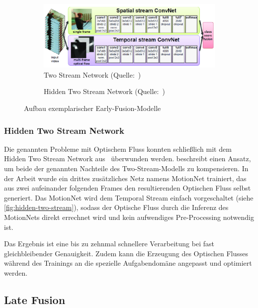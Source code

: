 \begin{figure}
    \centering
    \begin{subfigure}[b]{.5\textwidth}
        \centering
        \includegraphics[width=.95\linewidth]{img/03_Simonyan14}
        \caption{Two Stream Network (Quelle:~\cite{Simonyan14})}
        \label{fig:two-stream}
    \end{subfigure}%
    \hfill
    \begin{subfigure}[b]{.5\textwidth}
        \centering
        \caption{Hidden Two Stream Network (Quelle:~\cite{Zhu17})}
        \label{fig:hidden-two-stream}
    \end{subfigure}
    \caption{Aufbau exemplarischer Early-Fusion-Modelle}
\end{figure}

\subsubsection{Hidden Two Stream Network}

Die genannten Probleme mit Optischem Fluss konnten schließlich mit dem Hidden Two Stream Network aus~\cite{Zhu17} überwunden werden.
\cite{Zhu17} beschreibt einen Ansatz, um beide der genannten Nachteile des Two-Stream-Modells zu kompensieren.
In der Arbeit wurde ein drittes zusätzliches Netz namens MotionNet trainiert, das aus zwei aufeinander folgenden Frames den resultierenden Optischen Fluss selbst generiert.
Das MotionNet wird dem Temporal Stream einfach vorgeschaltet (siehe \autoref{fig:hidden-two-stream}), sodass der Optische Fluss durch die Inferenz des MotionNets direkt errechnet wird und kein aufwendiges Pre-Processing notwendig ist.

Das Ergebnis ist eine bis zu zehnmal schnellere Verarbeitung bei fast gleichbleibender Genauigkeit.
Zudem kann die Erzeugung des Optischen Flusses während des Trainings an die spezielle Aufgabendomäne angepasst und optimiert werden.

\subsection{Late Fusion}
\label{subsec:late-fusion}

